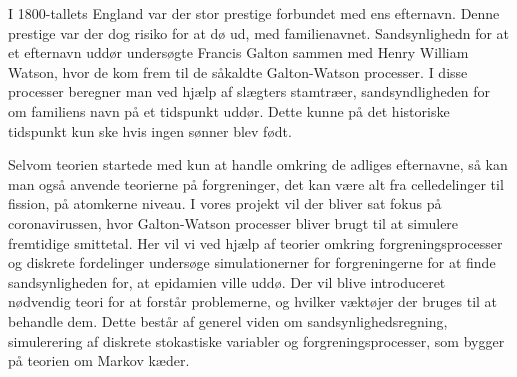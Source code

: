 I 1800-tallets England var der stor prestige forbundet med ens efternavn. Denne prestige var der dog risiko for at dø ud, med familienavnet. Sandsynlighedn for at et efternavn uddør undersøgte Francis Galton sammen med Henry William Watson, hvor de kom frem til de såkaldte Galton-Watson processer. I disse processer beregner man ved hjælp af slægters stamtræer,  sandsyndligheden for om familiens navn på et tidspunkt uddør. Dette kunne på det historiske tidspunkt kun ske hvis ingen sønner blev født.

\quad Selvom teorien startede med kun at handle omkring de adliges efternavne, så kan man også anvende teorierne på forgreninger, det kan være alt fra celledelinger til fission, på atomkerne niveau. I vores projekt vil der bliver sat fokus på coronavirussen, hvor Galton-Watson processer bliver brugt til at simulere fremtidige smittetal. Her vil vi ved hjælp af teorier omkring forgreningsprocesser og diskrete fordelinger undersøge simulationerner for forgreningerne for at finde sandsynligheden for, at epidamien ville uddø. Der vil blive introduceret  nødvendig teori for at forstår problemerne, og hvilker væktøjer der bruges til at behandle dem. Dette består af generel viden om sandsynlighedsregning, simulerering af diskrete stokastiske variabler og forgreningsprocesser, som bygger på teorien om Markov kæder. 
